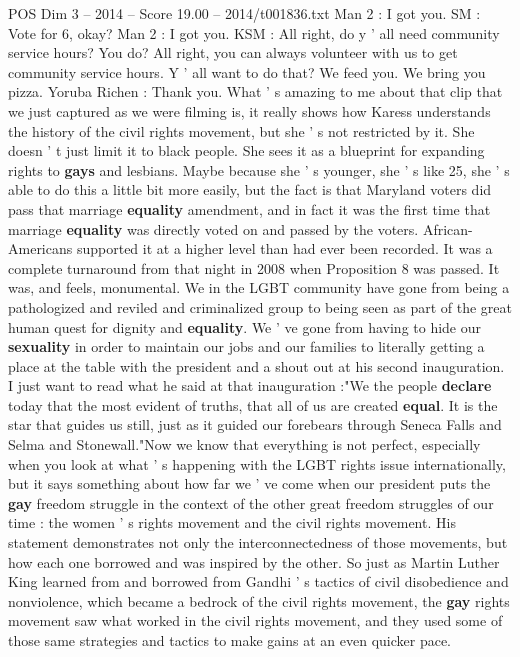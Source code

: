\begin{textsample}{POS Dim 3 – 2014 – Score 19.00 – 2014/t001836.txt}
Man 2 : I got you.
SM : Vote for 6, okay?
Man 2 : I got you.
KSM : All right, do y ' all need community service hours?
You do?
All right, you can always volunteer with us to get community service hours.
Y ' all want to do that?
We feed you.
We bring you pizza.
Yoruba Richen : Thank you.
What ' s amazing to me about that clip that we just captured as we were filming is, it really shows how Karess understands the history of the civil rights movement, but she ' s not restricted by it.
She doesn ' t just limit it to black people.
She sees it as a blueprint for expanding rights to \textbf{gays} and lesbians.
Maybe because she ' s younger, she ' s like 25, she ' s able to do this a little bit more easily, but the fact is that Maryland voters did pass that marriage \textbf{equality} amendment, and in fact it was the first time that marriage \textbf{equality} was directly voted on and passed by the voters.
African- Americans supported it at a higher level than had ever been recorded.
It was a complete turnaround from that night in 2008 when Proposition 8 was passed.
It was, and feels, monumental.
We in the LGBT community have gone from being a pathologized and reviled and criminalized group to being seen as part of the great human quest for dignity and \textbf{equality}.
We ' ve gone from having to hide our \textbf{sexuality} in order to maintain our jobs and our families to literally getting a place at the table with the president and a shout out at his second inauguration.
I just want to read what he said at that inauguration :"We the people \textbf{declare} today that the most evident of truths, that all of us are created \textbf{equal}.
It is the star that guides us still, just as it guided our forebears through Seneca Falls and Selma and Stonewall."Now we know that everything is not perfect, especially when you look at what ' s happening with the LGBT rights issue internationally, but it says something about how far we ' ve come when our president puts the \textbf{gay} freedom struggle in the context of the other great freedom struggles of our time : the women ' s rights movement and the civil rights movement.
His statement demonstrates not only the interconnectedness of those movements, but how each one borrowed and was inspired by the other.
So just as Martin Luther King learned from and borrowed from Gandhi ' s tactics of civil disobedience and nonviolence, which became a bedrock of the civil rights movement, the \textbf{gay} rights movement saw what worked in the civil rights movement, and they used some of those same strategies and tactics to make gains at an even quicker pace.

\end{textsample}
